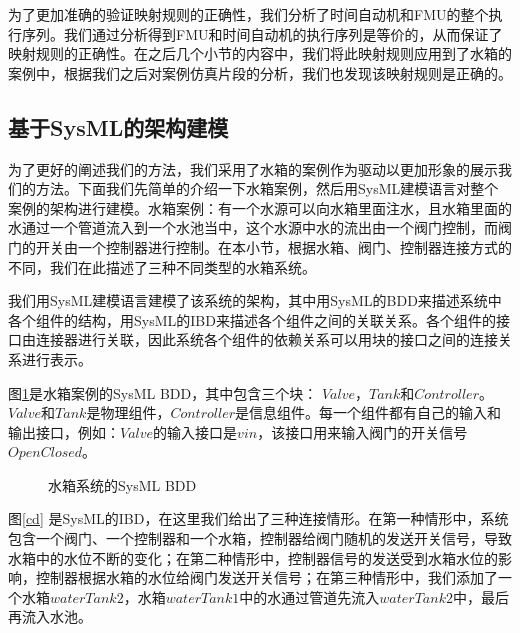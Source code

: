 为了更加准确的验证映射规则的正确性，我们分析了时间自动机和FMU的整个执行序列。我们通过分析得到FMU和时间自动机的执行序列是等价的，从而保证了映射规则的正确性。在之后几个小节的内容中，我们将此映射规则应用到了水箱的案例中，根据我们之后对案例仿真片段的分析，我们也发现该映射规则是正确的。 
\subsection{基于SysML的架构建模} 
为了更好的阐述我们的方法，我们采用了水箱的案例\cite{Am2016Checking}作为驱动以更加形象的展示我们的方法。下面我们先简单的介绍一下水箱案例，然后用SysML建模语言对整个案例的架构进行建模。水箱案例：有一个水源可以向水箱里面注水，且水箱里面的水通过一个管道流入到一个水池当中，这个水源中水的流出由一个阀门控制，而阀门的开关由一个控制器进行控制。在本小节，根据水箱、阀门、控制器连接方式的不同，我们在此描述了三种不同类型的水箱系统。

我们用SysML建模语言建模了该系统的架构，其中用SysML的BDD来描述系统中各个组件的结构，用SysML的IBD来描述各个组件之间的关联关系。各个组件的接口由连接器进行关联，因此系统各个组件的依赖关系可以用块的接口之间的连接关系进行表示。

图\ref{myad}是水箱案例的SysML BDD，其中包含三个块： $Valve$，$Tank$和$Controller$。$Valve$和$Tank$是物理组件，$Controller$是信息组件。每一个组件都有自己的输入和输出接口，例如：$Valve$的输入接口是$vin$，该接口用来输入阀门的开关信号$OpenClosed$。
\begin{figure}[htbp]
	\caption{水箱系统的SysML BDD}
	\label{myad}
\end{figure}

图\ref{cd} 是SysML的IBD，在这里我们给出了三种连接情形。在第一种情形中，系统包含一个阀门、一个控制器和一个水箱，控制器给阀门随机的发送开关信号，导致水箱中的水位不断的变化；在第二种情形中，控制器信号的发送受到水箱水位的影响，控制器根据水箱的水位给阀门发送开关信号；在第三种情形中，我们添加了一个水箱$waterTank2$，水箱$waterTank1$中的水通过管道先流入$waterTank2$中，最后再流入水池。

